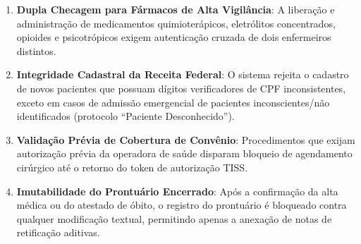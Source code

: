 \documentclass[12pt,oneside,a4paper,article]{abntex2}
\begin{document}
\begin{enumerate}[label=\textbf{RN-\arabic*:}, leftmargin=*]
  \item \textbf{Dupla Checagem para Fármacos de Alta Vigilância}: A liberação e administração de medicamentos quimioterápicos, eletrólitos concentrados, opioides e psicotrópicos exigem autenticação cruzada de dois enfermeiros distintos.
  \item \textbf{Integridade Cadastral da Receita Federal}: O sistema rejeita o cadastro de novos pacientes que possuam dígitos verificadores de CPF inconsistentes, exceto em casos de admissão emergencial de pacientes inconscientes/não identificados (protocolo ``Paciente Desconhecido'').
  \item \textbf{Validação Prévia de Cobertura de Convênio}: Procedimentos que exijam autorização prévia da operadora de saúde disparam bloqueio de agendamento cirúrgico até o retorno do token de autorização TISS.
  \item \textbf{Imutabilidade do Prontuário Encerrado}: Após a confirmação da alta médica ou do atestado de óbito, o registro do prontuário é bloqueado contra qualquer modificação textual, permitindo apenas a anexação de notas de retificação aditivas.
\end{enumerate}
\end{document}
